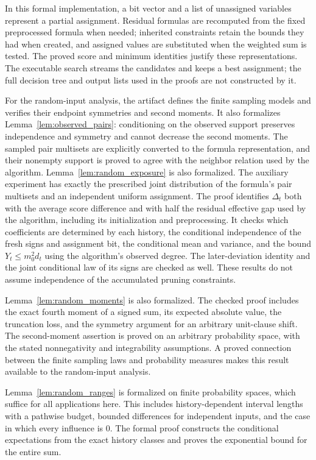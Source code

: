 \documentclass[11pt,a4paper]{article}
\theoremstyle{definition}
\theoremstyle{remark}
\begin{document}
In this formal implementation, a bit vector and a list of unassigned
variables represent a partial assignment. Residual formulas are
recomputed from the fixed preprocessed formula when needed; inherited
constraints retain the bounds they had when created, and assigned values
are substituted when the weighted sum is tested. The proved score and
minimum identities justify these representations. The executable search
streams the candidates and keeps a best assignment; the full decision
tree and output lists used in the proofs are not constructed by it.

For the random-input analysis, the artifact defines the finite sampling
models and verifies their endpoint symmetries and second moments. It also
formalizes Lemma~\ref{lem:observed_pairs}: conditioning on the observed
support preserves independence and symmetry and cannot decrease the
second moments. The sampled pair multisets are explicitly converted to
the formula representation, and their nonempty support is proved to agree
with the neighbor relation used by the algorithm.
Lemma~\ref{lem:random_exposure} is also formalized. The auxiliary experiment
has exactly the prescribed joint distribution of the formula's pair
multisets and an independent uniform assignment. The proof identifies
$\Delta_t$ both with the average score difference and with half the
residual effective gap used by the algorithm, including its initialization
and preprocessing. It checks which coefficients are determined by each
history, the conditional independence of the fresh signs and assignment
bit, the conditional mean and variance, and the bound $Y_t\le m_0^2d_t$
using the algorithm's observed degree. The later-deviation identity and
the joint conditional law of its signs are checked as well. These results
do not assume independence of the accumulated pruning constraints.

Lemma~\ref{lem:random_moments} is also formalized. The checked
proof includes the exact fourth moment of a signed sum, its expected
absolute value, the truncation loss, and the symmetry argument for an
arbitrary unit-clause shift. The second-moment assertion is proved on
an arbitrary probability space, with the stated nonnegativity and
integrability assumptions. A proved connection between the finite
sampling laws and probability measures makes this result available to
the random-input analysis.

Lemma~\ref{lem:random_ranges} is formalized on finite probability spaces,
which suffice for all applications here. This includes history-dependent
interval lengths with a pathwise budget, bounded differences for
independent inputs, and the case in which every influence is $0$.
The formal proof constructs the conditional expectations from the exact
history classes and proves the exponential bound for the entire sum.
\end{document}
